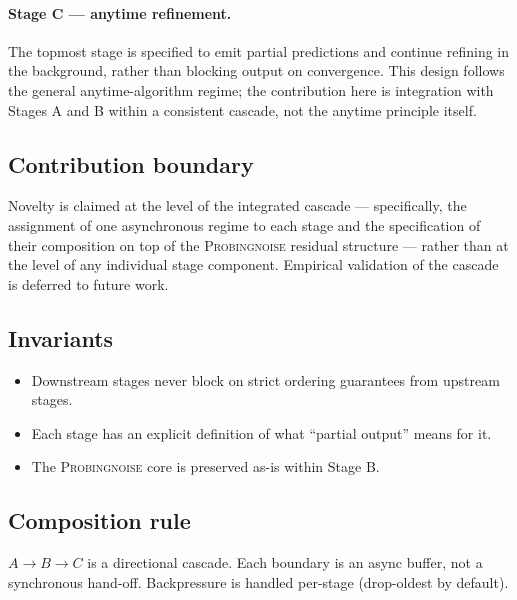 \paragraph{Stage C --- anytime refinement.} The topmost stage is specified to
emit partial predictions and continue refining in the background, rather than
blocking output on convergence. This design follows the general
anytime-algorithm regime; the contribution here is integration with Stages A
and B within a consistent cascade, not the anytime principle itself.

\subsection{Contribution boundary}

Novelty is claimed at the level of the integrated cascade --- specifically,
the assignment of one asynchronous regime to each stage and the specification
of their composition on top of the \textsc{Probingnoise} residual structure
--- rather than at the level of any individual stage component. Empirical
validation of the cascade is deferred to future work.

\subsection{Invariants}

\begin{itemize}
  \item Downstream stages never block on strict ordering guarantees from upstream stages.
  \item Each stage has an explicit definition of what ``partial output'' means for it.
  \item The \textsc{Probingnoise} core is preserved as-is within Stage B.
\end{itemize}

\subsection{Composition rule}

$A \to B \to C$ is a directional cascade. Each boundary is an async buffer,
not a synchronous hand-off. Backpressure is handled per-stage (drop-oldest by
default).
